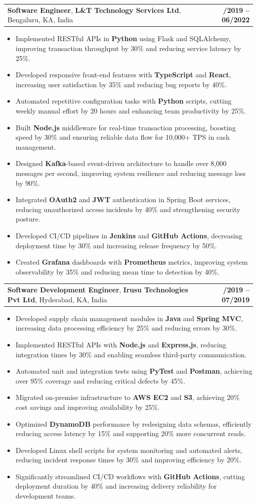 \documentclass[letterpaper,11pt]{article}
\makeatletter
\newcommand{\resumeItem}[1]{
  \item\footnotesize{
    {#1 \vspace{-2pt}}
  }
}
\newcommand{\resumeSubheading}[4]{
  \vspace{-2pt}\item
    \begin{tabular*}{1.0\textwidth}[t]{l@{\extracolsep{\fill}}r}
      \textbf{\fontsize{10pt}{14pt}\selectfont #3}, \textbf{\fontsize{10pt}{14pt}\selectfont #1}, \fontsize{10pt}{14pt}\selectfont #4 & \textbf{\fontsize{10pt}{14pt}\selectfont #2} \\
    \end{tabular*}\vspace{-7pt}
}
\newcommand{\resumeItemListStart}{\begin{itemize}[leftmargin=*]}
\newcommand{\resumeItemListEnd}{\end{itemize}\vspace{-5pt}}
\makeatother
\begin{document}
    \resumeSubheading
        {L\&T Technology Services Ltd}{08/2019 -- 06/2022}
        {Software Engineer}{Bengaluru, KA, India}
      \resumeItemListStart
        \resumeItem{Implemented RESTful APIs in \textbf{Python} using Flask and SQLAlchemy, improving transaction throughput by 30\% and reducing service latency by 25\%.}
        \resumeItem{Developed responsive front-end features with \textbf{TypeScript} and \textbf{React}, increasing user satisfaction by 35\% and reducing bug reports by 40\%.}
        \resumeItem{Automated repetitive configuration tasks with \textbf{Python} scripts, cutting weekly manual effort by 20 hours and enhancing team productivity by 25\%.}
        \resumeItem{Built \textbf{Node.js} middleware for real-time transaction processing, boosting speed by 30\% and ensuring reliable data flow for 10,000+ TPS in cash management.}
        \resumeItem{Designed \textbf{Kafka}-based event-driven architecture to handle over 8,000 messages per second, improving system resilience and reducing message loss by 90\%.}
        \resumeItem{Integrated \textbf{OAuth2} and \textbf{JWT} authentication in Spring Boot services, reducing unauthorized access incidents by 40\% and strengthening security posture.}
        \resumeItem{Developed CI/CD pipelines in \textbf{Jenkins} and \textbf{GitHub Actions}, decreasing deployment time by 30\% and increasing release frequency by 50\%.}
        \resumeItem{Created \textbf{Grafana} dashboards with \textbf{Prometheus} metrics, improving system observability by 35\% and reducing mean time to detection by 40\%.}
      \resumeItemListEnd

    \resumeSubheading
        {Irusu Technologies Pvt Ltd}{01/2019 -- 07/2019}
        {Software Development Engineer}{Hyderabad, KA, India}
      \resumeItemListStart
        \resumeItem{Developed supply chain management modules in \textbf{Java} and \textbf{Spring MVC}, increasing data processing efficiency by 25\% and reducing errors by 30\%.}
        \resumeItem{Implemented RESTful APIs with \textbf{Node.js} and \textbf{Express.js}, reducing integration times by 30\% and enabling seamless third-party communication.}
        \resumeItem{Automated unit and integration tests using \textbf{PyTest} and \textbf{Postman}, achieving over 95\% coverage and reducing critical defects by 45\%.}
        \resumeItem{Migrated on-premise infrastructure to \textbf{AWS EC2} and \textbf{S3}, achieving 20\% cost savings and improving availability by 25\%.}
        \resumeItem{Optimized \textbf{DynamoDB} performance by redesigning data schemas, efficiently reducing access latency by 15\% and supporting 20\% more concurrent reads.}
        \resumeItem{Developed Linux shell scripts for system monitoring and automated alerts, reducing incident response times by 30\% and improving efficiency by 20\%.}
        \resumeItem{Significantly streamlined CI/CD workflows with \textbf{GitHub Actions}, cutting deployment duration by 40\% and increasing delivery reliability for development teams.}
      \resumeItemListEnd
\end{document}
